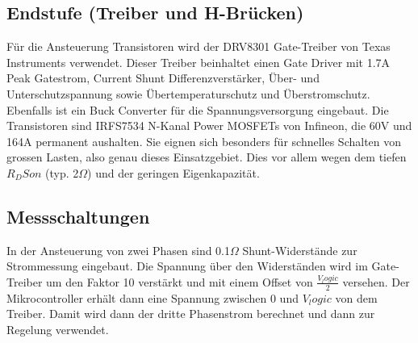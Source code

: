 \subsection*{Endstufe (Treiber und H-Brücken)}
Für die Ansteuerung Transistoren wird der DRV8301 Gate-Treiber von Texas Instruments verwendet. Dieser Treiber beinhaltet einen Gate Driver mit 1.7A Peak Gatestrom, Current Shunt Differenzverstärker, Über- und Unterschutzspannung sowie Übertemperaturschutz und Überstromschutz. Ebenfalls ist ein Buck Converter für die Spannungsversorgung eingebaut.
Die Transistoren sind IRFS7534 N-Kanal Power MOSFETs von Infineon, die 60V und 164A permanent aushalten. Sie eignen sich besonders für schnelles Schalten von grossen Lasten, also genau dieses Einsatzgebiet. Dies vor allem wegen dem tiefen $R_DSon$ (typ. 2\(\Omega\)) und der geringen Eigenkapazität. 

\subsection*{Messschaltungen}
In der Ansteuerung von zwei Phasen sind 0.1\(\Omega\) Shunt-Widerstände zur Strommessung eingebaut. Die Spannung über den Widerständen wird im Gate-Treiber um den Faktor 10 verstärkt und mit einem Offset von $\frac{V_logic}{2}$ versehen. Der Mikrocontroller erhält dann eine Spannung zwischen 0 und $V_logic$ von dem Treiber. Damit wird dann der dritte Phasenstrom berechnet und dann zur Regelung verwendet.
